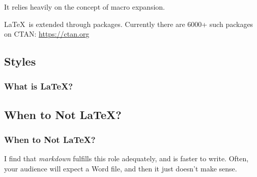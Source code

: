 {\begin{frame}[fragile]
  \vspace{5mm}
  It relies heavily on the concept of macro expansion.
  
  \vspace{5mm}
  \LaTeX\ is extended through packages. Currently there are 6000+ such packages on CTAN: \url{https://ctan.org}
\end{frame}

\subsection{Styles}
\begin{frame}[fragile]
  \frametitle{What is \LaTeX? }
  \vspace{3mm}
  
\end{frame}

\subsection{When to Not \LaTeX?}
\begin{frame}[fragile]
  \frametitle{When to Not \LaTeX?}
  \vspace{3mm}
  \begin{itemize}
     I find that \textsl{markdown} fulfills this role adequately, and is faster to write.
     Often, your audience will expect a Word file, and then it just doesn't make sense.
  \end{itemize}
\end{frame}

}


